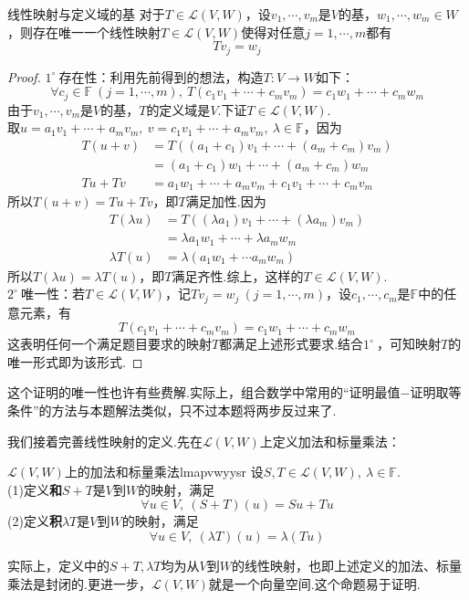 \documentclass[lang=cn, zihao=5]{elegantbook}
\newcommand{\F}{\mathbb{F}}
\newcommand{\lmap}{\mathcal{L}}
\newcommand{\buzhou}[1]{$#1^{\circ} \ $}
\begin{document}
\begin{proposition}{线性映射与定义域的基}
	对于$T \in \lmap (V,W)$，设$v_1, \cdots ,v_m$是$V$的基，$w_1, \cdots ,w_m \in W$，则存在唯一一个线性映射$T \in \lmap (V,W)$使得对任意$j=1, \cdots ,m$都有$$Tv_j = w_j$$
\end{proposition}
\begin{proof}
	\buzhou{1}存在性：利用先前得到的想法，构造$T:V \to W$如下：$$\forall c_j \in \F~(j=1, \cdots,m),~T(c_1v_1 + \cdots + c_mv_m) = c_1w_1 + \cdots + c_mw_m$$
	由于$v_1, \cdots ,v_m$是$V$的基，$T$的定义域是$V$.下证$T \in \lmap (V,W)$. \\
	取$u=a_1v_1 + \cdots + a_mv_m,~v=c_1v_1 + \cdots + a_mv_m,~ \lambda \in \F$，因为
	\begin{align*}
		T(u+v) &= T((a_1+c_1)v_1 + \cdots + (a_m+c_m)v_m) \\
		&= (a_1+c_1)w_1 + \cdots + (a_m+c_m)w_m \\
		Tu+Tv &= a_1w_1 + \cdots + a_mv_m + c_1v_1 + \cdots + c_mv_m
	\end{align*}
	所以$T(u+v)=Tu+Tv$，即$T$满足加性.因为
	\begin{align*}
		T(\lambda u) &= T((\lambda a_1)v_1 + \cdots + (\lambda a_m)v_m) \\
		&= \lambda a_1 w_1 + \cdots + \lambda a_m w_m \\
		\lambda T(u) &= \lambda (a_1w_1 + \cdots a_mw_m)
	\end{align*}
	所以$T(\lambda u)=\lambda T(u)$，即$T$满足齐性.综上，这样的$T \in \lmap (V,W)$. \\
	\buzhou{2}唯一性：若$T \in \lmap (V,W)$，记$T v_j = w_j~(j=1,\cdots ,m)$，设$c_1, \cdots ,c_m$是$\F$中的任意元素，有$$T(c_1v_1 + \cdots + c_mv_m) = c_1w_1 + \cdots + c_mw_m$$
	这表明任何一个满足题目要求的映射$T$都满足上述形式要求.结合\buzhou{1}，可知映射$T$的唯一形式即为该形式.
\end{proof}
\begin{remark}
	这个证明的唯一性也许有些费解.实际上，组合数学中常用的“证明最值$-$证明取等条件”的方法与本题解法类似，只不过本题将两步反过来了.
\end{remark}

我们接着完善线性映射的定义.先在$\lmap (V,W)$上定义加法和标量乘法：

\begin{definition}{$\lmap (V,W)$上的加法和标量乘法}{lmapvwyysr}
	设$S,T \in \lmap (V,W),~\lambda \in \F$. \\
	(1)定义\textbf{和}$S+T$是$V$到$W$的映射，满足$$\forall u \in V,~(S+T)(u)=Su+Tu$$
	(2)定义\textbf{积}$\lambda T$是$V$到$W$的映射，满足$$\forall u \in V,~(\lambda T)(u) = \lambda (Tu)$$
\end{definition}
\begin{remark}
	实际上，定义中的$S+T,\lambda T$均为从$V$到$W$的线性映射，也即上述定义的加法、标量乘法是封闭的.更进一步，$\lmap (V,W)$就是一个向量空间.这个命题易于证明.
\end{remark}
\end{document}
